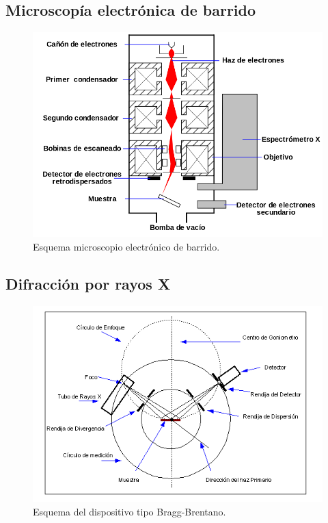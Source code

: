 \documentclass[11pt]{beamer}
\begin{document}
	\subsection{Microscopía electrónica de barrido}
		\begin{frame}{}
			\begin{figure}[H]
				\centering
				\includegraphics[scale=0.3]{img/SEM.png}
				\caption{Esquema microscopio electrónico de barrido.}
			\end{figure}
		\end{frame}
	
	\subsection{Difracción por rayos X}
		\begin{frame}{}
			\begin{figure}[H]
				\centering
				\includegraphics[scale=0.6]{img/gonio.png}
				\caption{Esquema del dispositivo tipo Bragg-Brentano.}
				
			\end{figure}
		\end{frame}
	
\end{document}
